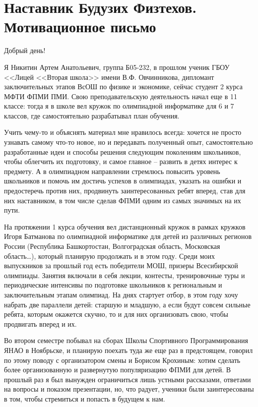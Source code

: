 \section{\textbf{Наставник Будузих Физтехов. Мотивационное письмо}}
\smallskip

\quad Добрый день!
\smallskip

\quad Я Никитин Артем Анатольевич, группа Б05-232, в прошлом ученик ГБОУ <<Лицей <<Вторая школа>> имени В.Ф. Овчинникова, дипломант
заключительных этапов ВсОШ по физике и экономике, сейчас студент 2 курса МФТИ ФПМИ ПМИ. Свою преподавательскую деятельность начал еще в 11
классе: тогда я в школе вел кружок по олимпиадной информатике для 6 и 7 классов, где самостоятельно разрабатывал план обучения.

\quad Учить чему-то и объяснять материал мне нравилось всегда: хочется не просто узнавать самому что-то новое, но и передавать полученный опыт,
самостоятельно разработанные идеи и способы решения следующим поколениям школьников, чтобы облегчить их подготовку, и самое главное – развить в
детях интерес к предмету. А в олимпиадном направлении стремлюсь повысить уровень школьников и помочь им достичь успехов в олимпиадах, указать
на ошибки и предостеречь против них, продвинуть заинтересованных ребят вперед, став для них наставником, в том числе сделав ФПМИ одним из самых
значимых на их пути.

\quad На протяжении 1 курса обучения вел дистанционный кружок в рамках кружков Игоря Батманова по олимпиадной информатике для детей из
различных регионов России (Республика Башкортостан, Волгоградская область, Московская область…), который планирую продолжать и в этом году.
Среди моих выпускников за прошлый год есть победители МОШ, призеры Всесибирской олимпиады. Занятия включали в себя лекции, контесты,
тренировочные туры и периодические интенсивы по подготовке школьников к региональным и заключительным этапам олимпиад. На днях стартует отбор,
в этом году хочу набрать две параллели детей: старшую и младшую, а если будут совсем сильные ребята, которым окажется скучно, то и для них
организовать свою, чтобы продвигать вперед и их.

\quad Во втором семестре побывал на сборах Школы Спортивного Программирования ЯНАО в Ноябрьске, и планирую поехать туда же еще раз в
предстоящем, говорил по этому поводу с организатором смены и Борисом Крохиным: хотим сделать более организованную и развернутую популяризацию
ФПМИ для детей. В прошлый раз я был вынужден ограничиться лишь устными рассказами, ответами на вопросы и показом презентации, но, что радует,
ученики были заинтересованы в том, чтобы стремиться и попасть в будущем к нам.

